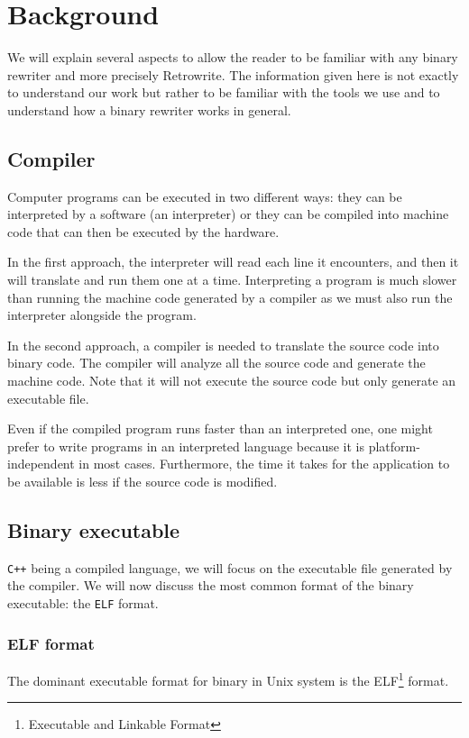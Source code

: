 \documentclass[a4paper,11pt,oneside]{report}
\newcommand{\sysname}{Retrowrite\xspace}
\begin{document}
\chapter{Background}
We will explain several aspects to allow the reader to be familiar
with any binary rewriter and more precisely \sysname. The information given
here is not exactly to understand our work but rather to be familiar with the
tools we use and to understand how a binary rewriter works in general.


\section{Compiler}
Computer programs can be executed in two different ways: they can be interpreted
by a software (an interpreter) or they can be compiled into machine code that can
then be executed by the hardware. 


In the first approach, the interpreter will read each line it encounters, and
then it will translate and run them one at a time. Interpreting a program
is much slower than running the machine code generated by a compiler as we must
also run the interpreter alongside the program.

In the second approach, a compiler is needed to translate the source code into
binary code.
The compiler will analyze all the source code and generate the machine code.
Note that it will not execute the source code but only generate an executable
file.


Even if the compiled program runs faster than an interpreted one, one might
prefer to write programs in an interpreted language because it is
platform-independent in most cases. Furthermore,  the time it takes for the
application to be available is less if the source code is modified.

\section{Binary executable}
\texttt{C++} being a compiled language, we will focus on the executable file
generated by the compiler. We will now discuss the most common format of the binary
executable: the \texttt{ELF} format.

\subsection{ELF format}
%
The dominant executable format for binary in Unix system is the
ELF\footnote{Executable and Linkable Format} format. 
\end{document}
